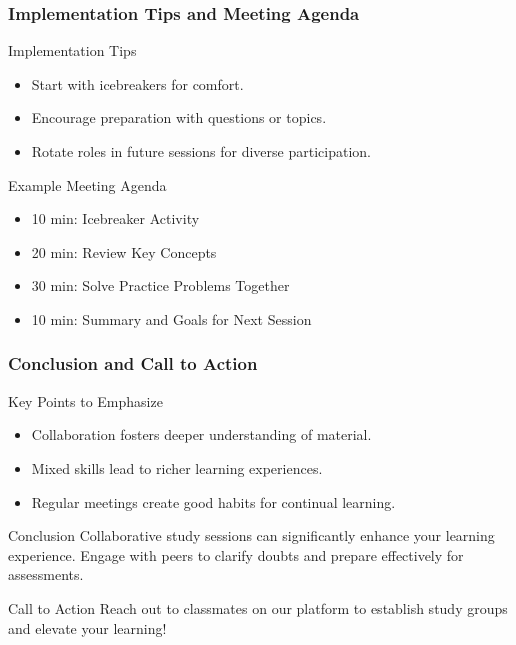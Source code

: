 \documentclass[aspectratio=169]{beamer}
\begin{document}
\begin{frame}[fragile]
    \frametitle{Implementation Tips and Meeting Agenda}
    \begin{block}{Implementation Tips}
        \begin{itemize}
            \item Start with icebreakers for comfort.
            \item Encourage preparation with questions or topics.
            \item Rotate roles in future sessions for diverse participation.
        \end{itemize}
    \end{block}

    \begin{block}{Example Meeting Agenda}
        \begin{itemize}
            \item 10 min: Icebreaker Activity
            \item 20 min: Review Key Concepts
            \item 30 min: Solve Practice Problems Together
            \item 10 min: Summary and Goals for Next Session
        \end{itemize}
    \end{block}
\end{frame}

\begin{frame}[fragile]
    \frametitle{Conclusion and Call to Action}
    \begin{block}{Key Points to Emphasize}
        \begin{itemize}
            \item Collaboration fosters deeper understanding of material.
            \item Mixed skills lead to richer learning experiences.
            \item Regular meetings create good habits for continual learning.
        \end{itemize}
    \end{block}

    \begin{block}{Conclusion}
        Collaborative study sessions can significantly enhance your learning experience. Engage with peers to clarify doubts and prepare effectively for assessments.
    \end{block}

    \begin{block}{Call to Action}
        Reach out to classmates on our platform to establish study groups and elevate your learning!
    \end{block}
\end{frame}
\end{document}
